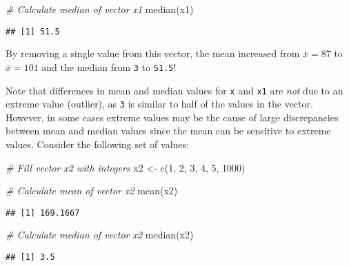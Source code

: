 \documentclass[
]{book}
\newenvironment{Shaded}{\begin{snugshade}}{\end{snugshade}}
\newcommand{\CommentTok}[1]{\textcolor[rgb]{0.56,0.35,0.01}{\textit{#1}}}
\newcommand{\DecValTok}[1]{\textcolor[rgb]{0.00,0.00,0.81}{#1}}
\newcommand{\FunctionTok}[1]{\textcolor[rgb]{0.00,0.00,0.00}{#1}}
\newcommand{\NormalTok}[1]{#1}
\newcommand{\OtherTok}[1]{\textcolor[rgb]{0.56,0.35,0.01}{#1}}
\begin{document}
\begin{Shaded}
\begin{Highlighting}[]
\CommentTok{\# Calculate median of vector x1}
\FunctionTok{median}\NormalTok{(x1)}
\end{Highlighting}
\end{Shaded}

\begin{verbatim}
## [1] 51.5
\end{verbatim}

By removing a single value from this vector, the mean increased from \(\bar{x} = 87\) to \(\bar{x} = 101\) and the median from \texttt{3} to \texttt{51.5}!

Note that differences in mean and median values for \texttt{x} and \texttt{x1} are \emph{not} due to an extreme value (outlier), as \texttt{3} is similar to half of the values in the vector. However, in some cases extreme values may be the cause of large discrepancies between mean and median values since the mean can be sensitive to extreme values. Consider the following set of values:

\begin{Shaded}
\begin{Highlighting}[]
\CommentTok{\# Fill vector x2 with integers}
\NormalTok{x2 }\OtherTok{\textless{}{-}} \FunctionTok{c}\NormalTok{(}\DecValTok{1}\NormalTok{, }\DecValTok{2}\NormalTok{, }\DecValTok{3}\NormalTok{, }\DecValTok{4}\NormalTok{, }\DecValTok{5}\NormalTok{, }\DecValTok{1000}\NormalTok{)}
\end{Highlighting}
\end{Shaded}

\begin{Shaded}
\begin{Highlighting}[]
\CommentTok{\# Calculate mean of vector x2}
\FunctionTok{mean}\NormalTok{(x2)}
\end{Highlighting}
\end{Shaded}

\begin{verbatim}
## [1] 169.1667
\end{verbatim}

\begin{Shaded}
\begin{Highlighting}[]
\CommentTok{\# Calculate median of vector x2}
\FunctionTok{median}\NormalTok{(x2)}
\end{Highlighting}
\end{Shaded}

\begin{verbatim}
## [1] 3.5
\end{verbatim}
\end{document}
